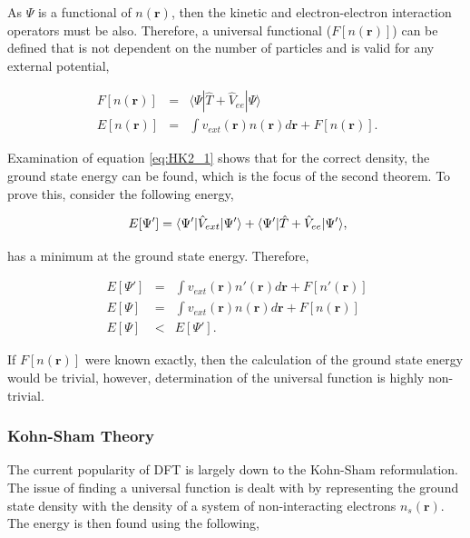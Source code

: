 As $\Psi$ is a functional of $n(\mathbf{r})$, then the kinetic and electron-electron interaction operators must be also.  Therefore, a universal functional ($F[n(\mathbf{r})]$) can be defined that is not dependent on the number of particles and is valid for any external potential,

\begin{eqnarray}
\ F[n(\mathbf{r})] &=& \langle \Psi | \hat{T}+\hat{V}_{ee} | \Psi \rangle \\ \label{eq:HK2_1}
\ E[n(\mathbf{r})] &=& \int v_{ext}(\mathbf{r}) n(\mathbf{r})d \mathbf{r} + F[n(\mathbf{r})] .
\end{eqnarray}

Examination of equation \ref{eq:HK2_1} shows that for the correct density, the ground state energy can be found, which is the focus of the second theorem.  To prove this, consider the following energy,

\begin{equation}
\ E [\Psi'] = \langle \Psi' | \hat{V}_{ext} | \Psi' \rangle + \langle \Psi' | \hat{T}+ \hat{V}_{ee} | \Psi' \rangle \\,
\end{equation}

has a minimum at the ground state energy.  Therefore,

\begin{eqnarray}
\ E [\Psi'] &=& \int v_{ext}(\mathbf{r}) n'(\mathbf{r}) d \mathbf{r} + F[n'(\mathbf{r})] \\
\ E [\Psi] &=& \int v_{ext}(\mathbf{r}) n(\mathbf{r}) d \mathbf{r} + F[n(\mathbf{r})] \\
\ E [\Psi] &<& E [\Psi'] .
\end{eqnarray}

If $F[n(\mathbf{r})]$ were known exactly, then the calculation of the ground state energy would be trivial, however, determination of the universal function is highly non-trivial.

\subsubsection{Kohn-Sham Theory}

The current popularity of DFT is largely down to the Kohn-Sham\cite{Kohn_Sham} reformulation.  The issue of finding a universal function is dealt with by representing the ground state density with the density of a system of non-interacting electrons $n_s(\mathbf{r})$.  The energy is then found using the following,

